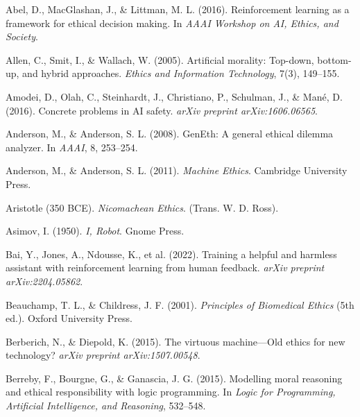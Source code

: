 \documentclass[12pt]{article}
\begin{document}

\begin{thebibliography}{99}

Abel, D., MacGlashan, J., \& Littman, M. L. (2016).
\newblock Reinforcement learning as a framework for ethical decision making.
\newblock In \textit{AAAI Workshop on AI, Ethics, and Society}.

Allen, C., Smit, I., \& Wallach, W. (2005).
\newblock Artificial morality: Top-down, bottom-up, and hybrid approaches.
\newblock \textit{Ethics and Information Technology}, 7(3), 149--155.

Amodei, D., Olah, C., Steinhardt, J., Christiano, P., Schulman, J., \& Mané, D. (2016).
\newblock Concrete problems in AI safety.
\newblock \textit{arXiv preprint arXiv:1606.06565}.

Anderson, M., \& Anderson, S. L. (2008).
\newblock GenEth: A general ethical dilemma analyzer.
\newblock In \textit{AAAI}, 8, 253--254.

Anderson, M., \& Anderson, S. L. (2011).
\newblock \textit{Machine Ethics}.
\newblock Cambridge University Press.

Aristotle (350 BCE).
\newblock \textit{Nicomachean Ethics}.
\newblock (Trans. W. D. Ross).

Asimov, I. (1950).
\newblock \textit{I, Robot}.
\newblock Gnome Press.

Bai, Y., Jones, A., Ndousse, K., et al. (2022).
\newblock Training a helpful and harmless assistant with reinforcement learning from human feedback.
\newblock \textit{arXiv preprint arXiv:2204.05862}.

Beauchamp, T. L., \& Childress, J. F. (2001).
\newblock \textit{Principles of Biomedical Ethics} (5th ed.).
\newblock Oxford University Press.

Berberich, N., \& Diepold, K. (2015).
\newblock The virtuous machine---Old ethics for new technology?
\newblock \textit{arXiv preprint arXiv:1507.00548}.

Berreby, F., Bourgne, G., \& Ganascia, J. G. (2015).
\newblock Modelling moral reasoning and ethical responsibility with logic programming.
\newblock In \textit{Logic for Programming, Artificial Intelligence, and Reasoning}, 532--548.


\end{thebibliography}
\end{document}
